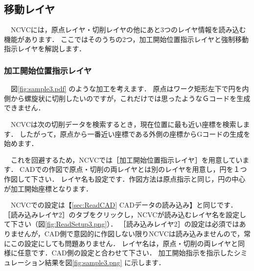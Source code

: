 

\subsection{移動レイヤ}
\label{sec:move}
　NCVCには，原点レイヤ・切削レイヤの他にあと3つのレイヤ情報を読み込む機能があります．
ここではそのうちの2つ，加工開始位置指示レイヤと強制移動指示レイヤを解説します．

\subsubsection{加工開始位置指示レイヤ}
　図\ref{fig:sample3.pdf} のような加工を考えます．
原点はワーク矩形左下で円を内側から螺旋状に切削したいのですが，これだけでは思ったようなＧコードを生成できません．

　NCVCは次の切削データを検索するとき，現在位置に最も近い座標を検索します．
したがって，原点から一番近い座標である外側の座標からGコードの生成を始めます．

　これを回避するため，NCVCでは［加工開始位置指示レイヤ］を用意しています．
CADでの作図で原点・切削の両レイヤとは別のレイヤを用意し，円を１つ作図して下さい．
レイヤ名も設定です．作図方法は原点指示と同じ，円の中心が加工開始座標となります．

　NCVCでの設定は【\ref{sec:ReadCAD} CADデータの読み込み】と同じです．
［読み込みレイヤ2］のタブをクリックし，NCVCが読み込むレイヤ名を設定して下さい（図\ref{fig:ReadSetup3.png}）．
［読み込みレイヤ2］の設定は必須ではありませんが，CAD側で意図的に作図しない限りNCVCは読み込みませんので，常にこの設定にしても問題ありません．
レイヤ名は，原点・切削の両レイヤと同様に任意です．CAD側の設定と合わせて下さい．
加工開始指示を指示したシミュレーション結果を図\ref{fig:sample3.png} に示します．

